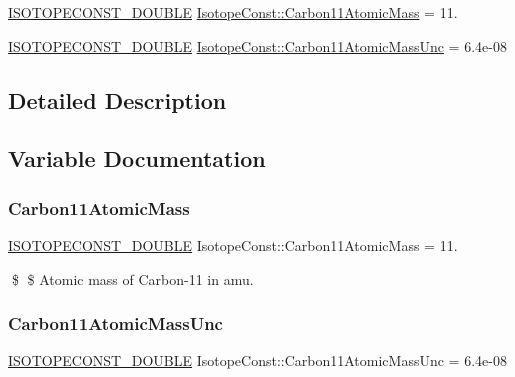 \begin{DoxyCompactItemize}
\item 
\mbox{\hyperlink{group___isotope_const-_macros_ga8f45a7272ce02c0b4c65c44636ed719a}{I\+S\+O\+T\+O\+P\+E\+C\+O\+N\+S\+T\+\_\+\+D\+O\+U\+B\+LE}} \mbox{\hyperlink{group___isotope_const-_carbon-_c11_gab86b9319fefd1f728cea66711090ef17}{Isotope\+Const\+::\+Carbon11\+Atomic\+Mass}} = 11.
\item 
\mbox{\hyperlink{group___isotope_const-_macros_ga8f45a7272ce02c0b4c65c44636ed719a}{I\+S\+O\+T\+O\+P\+E\+C\+O\+N\+S\+T\+\_\+\+D\+O\+U\+B\+LE}} \mbox{\hyperlink{group___isotope_const-_carbon-_c11_ga13699f2b218f150e75108c02493dd920}{Isotope\+Const\+::\+Carbon11\+Atomic\+Mass\+Unc}} = 6.\+4e-\/08
\end{DoxyCompactItemize}


\subsection{Detailed Description}


\subsection{Variable Documentation}
\mbox{\label{group___isotope_const-_carbon-_c11_gab86b9319fefd1f728cea66711090ef17}} 
\subsubsection{\texorpdfstring{Carbon11\+Atomic\+Mass}{Carbon11AtomicMass}}
{\footnotesize\ttfamily \mbox{\hyperlink{group___isotope_const-_macros_ga8f45a7272ce02c0b4c65c44636ed719a}{I\+S\+O\+T\+O\+P\+E\+C\+O\+N\+S\+T\+\_\+\+D\+O\+U\+B\+LE}} Isotope\+Const\+::\+Carbon11\+Atomic\+Mass = 11.}

\$ \$ Atomic mass of Carbon-\/11 in amu. \mbox{\label{group___isotope_const-_carbon-_c11_ga13699f2b218f150e75108c02493dd920}} 
\subsubsection{\texorpdfstring{Carbon11\+Atomic\+Mass\+Unc}{Carbon11AtomicMassUnc}}
{\footnotesize\ttfamily \mbox{\hyperlink{group___isotope_const-_macros_ga8f45a7272ce02c0b4c65c44636ed719a}{I\+S\+O\+T\+O\+P\+E\+C\+O\+N\+S\+T\+\_\+\+D\+O\+U\+B\+LE}} Isotope\+Const\+::\+Carbon11\+Atomic\+Mass\+Unc = 6.\+4e-\/08}

